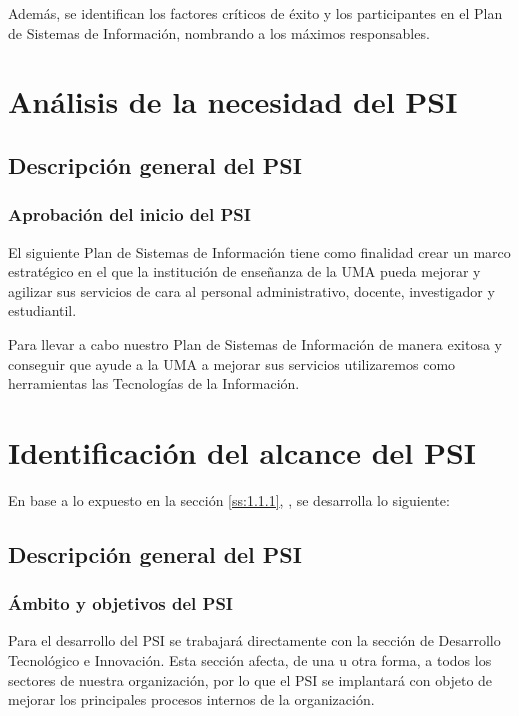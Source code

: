 \documentclass[11pt,a4paper,spanish,twoside]{book}
\begin{document}
Además, se identifican los factores críticos de éxito y los participantes en
el Plan de Sistemas de Información, nombrando a los máximos responsables.

\section{Análisis de la necesidad del PSI}
\subsection{Descripción general del PSI}\label{ss:1.1.1}
\subsubsection{Aprobación del inicio del PSI}
El siguiente Plan de Sistemas de Información tiene como finalidad crear un 
marco estratégico en el que la institución de enseñanza de la UMA pueda
mejorar y agilizar sus servicios de cara al personal administrativo, docente, 
investigador y estudiantil.

Para llevar a cabo nuestro Plan de Sistemas de Información de manera exitosa 
y conseguir que ayude a la UMA a mejorar sus servicios utilizaremos como 
herramientas las Tecnologías de la Información.

\section{Identificación del alcance del PSI}
En base a lo expuesto en la sección \vref{ss:1.1.1}, \emph{},
se desarrolla lo siguiente:

\subsection{Descripción general del PSI}\label{ss:1.2.1}
\subsubsection{Ámbito y objetivos del PSI}
Para el desarrollo del PSI se trabajará directamente con la sección de 
Desarrollo Tecnológico e Innovación. Esta sección afecta, de una u otra
forma, a todos los sectores de nuestra organización, por lo que el PSI se
implantará con objeto de mejorar los principales procesos internos de la
organización.
\end{document}
